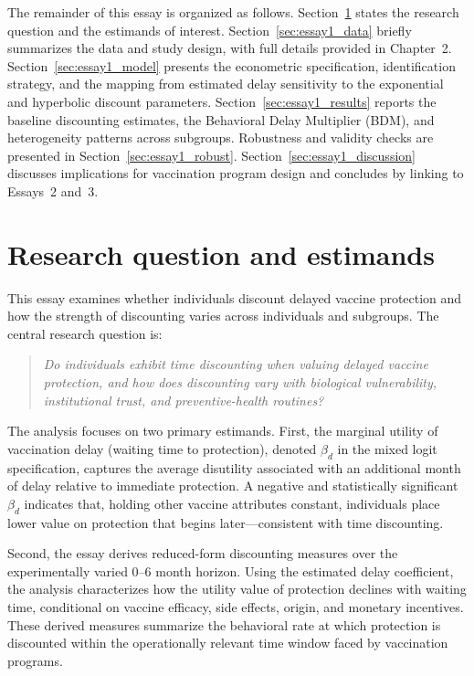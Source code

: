 \documentclass[doublespacing]{utdthesis}
\begin{document}
The remainder of this essay is organized as follows. Section~\ref{sec:essay1_rq} states the research question and the estimands of interest. Section~\ref{sec:essay1_data} briefly summarizes the data and study design, with full details provided in Chapter~2. Section~\ref{sec:essay1_model} presents the econometric specification, identification strategy, and the mapping from estimated delay sensitivity to the exponential and hyperbolic discount parameters. Section~\ref{sec:essay1_results} reports the baseline discounting estimates, the Behavioral Delay Multiplier (BDM), and heterogeneity patterns across subgroups. Robustness and validity checks are presented in Section~\ref{sec:essay1_robust}. Section~\ref{sec:essay1_discussion} discusses implications for vaccination program design and concludes by linking to Essays~2 and~3.


\section{Research question and estimands}
\label{sec:essay1_rq}

This essay examines whether individuals discount delayed vaccine protection and how the strength of discounting varies across individuals and subgroups. The central research question is:

\begin{quote}
\textit{Do individuals exhibit time discounting when valuing delayed vaccine protection, and how does discounting vary with biological vulnerability, institutional trust, and preventive-health routines?}
\end{quote}

The analysis focuses on two primary estimands. First, the marginal utility of vaccination delay (waiting time to protection), denoted $\beta_{d}$ in the mixed logit specification, captures the average disutility associated with an additional month of delay relative to immediate protection. A negative and statistically significant $\beta_{d}$ indicates that, holding other vaccine attributes constant, individuals place lower value on protection that begins later—consistent with time discounting.

Second, the essay derives reduced-form discounting measures over the experimentally varied 0--6 month horizon. Using the estimated delay coefficient, the analysis characterizes how the utility value of protection declines with waiting time, conditional on vaccine efficacy, side effects, origin, and monetary incentives. These derived measures summarize the behavioral rate at which protection is discounted within the operationally relevant time window faced by vaccination programs.
\end{document}
